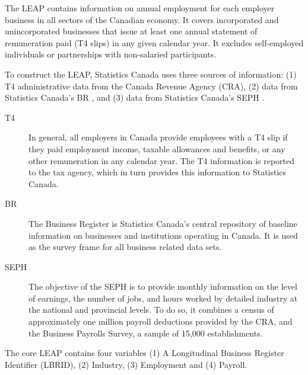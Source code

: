 
The \ac{LEAP} \citep{StatisticsCanada2019} contains information on annual employment for each employer business in all sectors of the Canadian economy. It covers incorporated and unincorporated businesses that issue at least one annual statement of remuneration paid (T4 slips) in any given calendar year. It excludes self-employed individuals or partnerships with non-salaried participants.

To construct the \ac{LEAP}, Statistics Canada uses three sources of information: (1) T4 administrative data  from the Canada Revenue Agency (CRA), (2) data from Statistics Canada's \acl{BR} \citep{StatisticsCanada2019a}, and (3) data from  Statistics Canada's \acf{SEPH} \citep{StatisticsCanada2019b}. 



\begin{description}
\item[T4] In general, all employers in Canada provide employees with a T4 slip if they paid employment income, taxable allowances and benefits, or any other remuneration in any calendar year. The T4 information is reported to the tax agency, which in turn provides this information to Statistics Canada. 

\item[BR] The Business Register is Statistics Canada's central repository of baseline information on businesses and institutions operating in Canada. It is used as the survey frame for all business related data sets.

\item[SEPH] The objective of the \ac{SEPH} is to provide monthly information on the level of earnings, the number of jobs, and hours worked by detailed industry at the national and provincial levels. To do so, it combines a census of approximately one million payroll deductions provided by the CRA, and the Business Payrolls Survey, a sample of 15,000 establishments.  
\end{description}
The core \ac{LEAP}  contains four variables (1) A Longitudinal Business Register Identifier (LBRID), (2) Industry, (3) Employment and (4) Payroll. 

